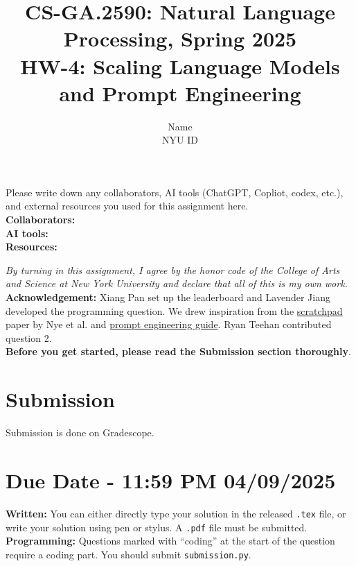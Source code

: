 \documentclass{article}
\title{\textbf{CS-GA.2590: Natural Language Processing, Spring 2025} \\HW-4: Scaling Language Models and Prompt Engineering}
\author{Name \\
NYU ID}
\date{}
\theoremstyle{case}
\theoremstyle{definition}
\begin{document}
\maketitle

\begin{tcolorbox}
Please write down any collaborators, AI tools (ChatGPT, Copliot, codex, etc.), and external resources you used for this assignment here. \\
\textbf{Collaborators:} \\
\textbf{AI tools:} \\
\textbf{Resources:}
\end{tcolorbox}
\textit{By turning in this assignment, I agree by the honor code of the College of Arts and Science at New York University and declare
that all of this is my own work.} \\

\textbf{Acknowledgement:} Xiang Pan set up the leaderboard and Lavender Jiang developed the programming question. We drew inspiration from the \href{https://arxiv.org/abs/2112.00114}{scratchpad} paper by Nye et al. and \href{https://www.promptingguide.ai/}{prompt engineering guide}. Ryan Teehan contributed question 2.\\


\textbf{Before you get started, please read the Submission section thoroughly}.

\section*{Submission}
Submission is done on Gradescope. \\

\section*{Due Date - 11:59 PM 04/09/2025}

\textbf{Written:} You can either directly type your solution in the released \texttt{.tex} file,
or write your solution using pen or stylus.
A \texttt{.pdf} file must be submitted.\\

\textbf{Programming:} Questions marked with ``coding'' at the start of the question require a coding part. You should submit \texttt{submission.py}.\\

\end{document}
